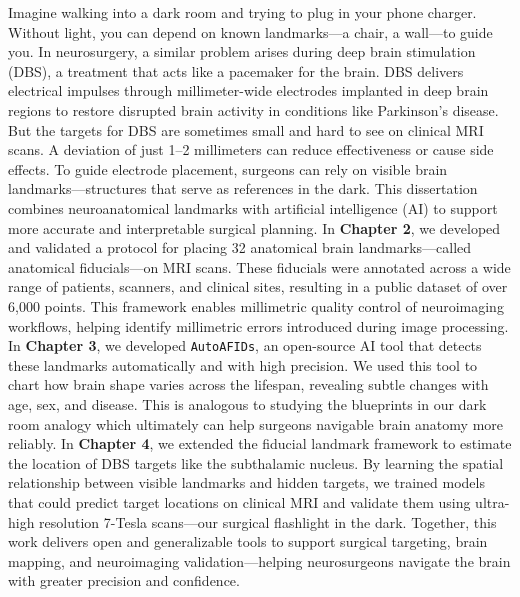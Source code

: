 \onehalfspacing
Imagine walking into a dark room and trying to plug in your phone charger. Without light, you can depend on known landmarks—a chair, a wall—to guide you. In neurosurgery, a similar problem arises during deep brain stimulation (DBS), a treatment that acts like a pacemaker for the brain. DBS delivers electrical impulses through millimeter-wide electrodes implanted in deep brain regions to restore disrupted brain activity in conditions like Parkinson’s disease. But the targets for DBS are sometimes small and hard to see on clinical MRI scans. A deviation of just 1–2 millimeters can reduce effectiveness or cause side effects. To guide electrode placement, surgeons can rely on visible brain landmarks—structures that serve as references in the dark. This dissertation combines neuroanatomical landmarks with artificial intelligence (AI) to support more accurate and interpretable surgical planning. In \textbf{Chapter 2}, we developed and validated a protocol for placing 32 anatomical brain landmarks—called anatomical fiducials—on MRI scans. These fiducials were annotated across a wide range of patients, scanners, and clinical sites, resulting in a public dataset of over 6,000 points. This framework enables millimetric quality control of neuroimaging workflows, helping identify millimetric errors introduced during image processing. In \textbf{Chapter 3}, we developed \texttt{AutoAFIDs}, an open-source AI tool that detects these landmarks automatically and with high precision. We used this tool to chart how brain shape varies across the lifespan, revealing subtle changes with age, sex, and disease. This is analogous to studying the blueprints in our dark room analogy which ultimately can help surgeons navigable brain anatomy more reliably. In \textbf{Chapter 4}, we extended the fiducial landmark framework to estimate the location of DBS targets like the subthalamic nucleus. By learning the spatial relationship between visible landmarks and hidden targets, we trained models that could predict target locations on clinical MRI and validate them using ultra-high resolution 7-Tesla scans—our surgical flashlight in the dark. Together, this work delivers open and generalizable tools to support surgical targeting, brain mapping, and neuroimaging validation—helping neurosurgeons navigate the brain with greater precision and confidence.

